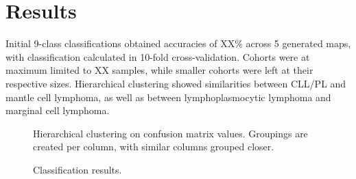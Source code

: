 \documentclass[11pt,a4paper]{article}
\begin{document}


\section{Results}

Initial 9-class classifications obtained accuracies of XX\% across 5 generated maps, with classification calculated in 10-fold cross-validation. Cohorts were at maximum limited to XX samples, while smaller cohorts were left at their respective sizes.
Hierarchical clustering showed similarities between CLL/PL and mantle cell lymphoma, as well as between lymphoplasmocytic lymphoma and marginal cell lymphoma.


\begin{figure}
   \centering
   \caption{Hierarchical clustering on confusion matrix values. Groupings are created per column, with similar columns grouped closer.}
\end{figure}



\begin{figure}
   \caption{Classification results.}
\end{figure}
\end{document}
